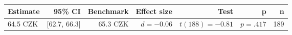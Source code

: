 \begin{tabular}{lrrrrrr}
\toprule
Estimate & 95\% CI & Benchmark & Effect size & Test & p & n \\
\midrule
64.5 CZK & [62.7, 66.3] & 65.3 CZK & $d=-0.06$ & $t(188)=-0.81$ & $p=.417$ & 189 \\
\bottomrule
\end{tabular}

